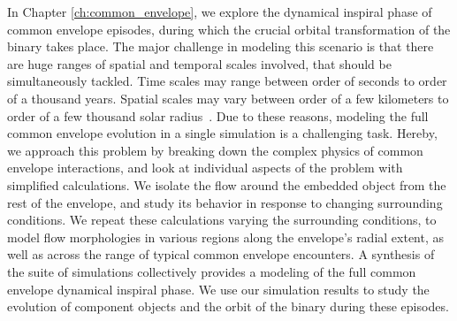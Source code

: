 In Chapter \ref{ch:common_envelope}, we explore the dynamical inspiral phase of common envelope episodes, during which the crucial orbital transformation of the binary takes place. The major challenge in modeling this scenario is that there are huge ranges of spatial and temporal scales involved, that should be simultaneously tackled. Time scales may range between order of seconds to order of a thousand years. Spatial scales may vary between order of a few kilometers to order of a few thousand solar radius~\cite{2013A&ARv..21...59I}. %
Due to these reasons, modeling the full common envelope evolution in a single simulation is a challenging task. Hereby, we approach this problem by breaking down the complex physics of common envelope interactions, and look at individual aspects of the problem with simplified calculations. We isolate the flow around the embedded object from the rest of the envelope, and study its behavior in response to changing surrounding conditions. We repeat these calculations varying the surrounding conditions, to model flow morphologies in various regions along the envelope's radial extent, as well as across the range of typical common envelope encounters. A synthesis of the suite of simulations collectively provides a modeling of the full common envelope dynamical inspiral phase. We use our simulation results to study the evolution of component objects and the orbit of the binary during these episodes. %

